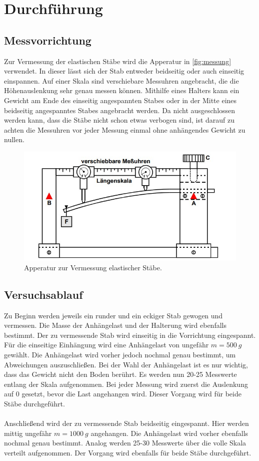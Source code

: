 \section{Durchführung}
\label{sec:Durchführung}

\subsection{Messvorrichtung}
Zur Vermessung der elastischen Stäbe wird die Apperatur in \autoref{fig:messung} verwendet. In dieser lässt sich der Stab entweder beidseitig oder auch
einseitig einspannen. Auf einer Skala sind verschiebare Messuhren angebracht, die die Höhenauslenkung sehr genau messen können. Mithilfe eines Halters kann 
ein Gewicht am Ende des einseitig angespannten Stabes oder in der Mitte eines beidseitig angespanntes Stabes angebracht werden. Da nicht ausgeschlossen werden kann,
dass die Stäbe nicht schon etwas verbogen sind, ist darauf zu achten die Messuhren vor jeder Messung einmal ohne anhängendes Gewicht zu nullen.
\begin{figure}[H]
    \includegraphics[width=\linewidth]{img/abb5.jpg}
    \caption{Apperatur zur Vermessung elastischer Stäbe.\cite{V103}}
    \label{fig:messung}
\end{figure}

\subsection{Versuchsablauf}
Zu Beginn werden jeweils ein runder und ein eckiger Stab gewogen und vermessen. Die Masse der Anhängelast und der Halterung wird ebenfalls bestimmt.
Der zu vermessende Stab wird einseitig in die Vorrichtung eingespannt. Für die einseitige Einhängung wird eine Anhängelast von ungefähr $m = \SI{500}{g}$ gewählt. 
Die Anhängelast wird vorher jedoch nochmal genau bestimmt, um Abweichungen auszuschließen.
Bei der Wahl der Anhängelast ist es nur wichtig, dass das Gewicht nicht den Boden berührt. Es werden nun 20-25 Messwerte entlang der Skala aufgenommen. 
Bei jeder Messung wird zuerst die Auslenkung auf 0 gesetzt, bevor die Last angehangen wird. Dieser Vorgang wird für beide Stäbe durchgeführt.
\\
\\
Anschließend wird der zu vermessende Stab beidseitig eingespannt. Hier werden mittig ungefähr $m = \SI{1000}{g}$ angehangen. Die Anhängelast wird vorher ebenfalls nochmal genau bestimmt. Analog werden 25-30 Messwerte über die
volle Skala verteilt aufgenommen. Der Vorgang wird ebenfalls für beide Stäbe durchgeführt.